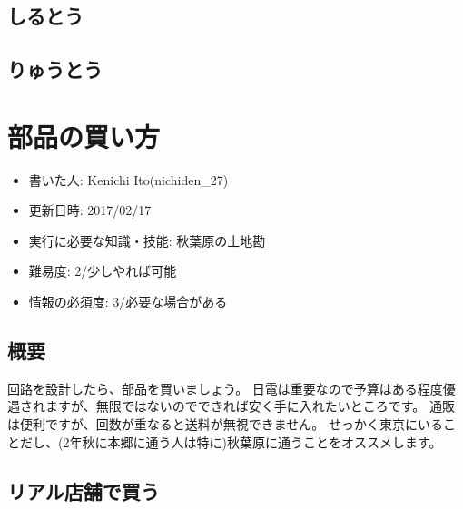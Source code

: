 \documentclass[letterpaper,10pt,dvipdfmx]{sphinxmanual}
\begin{document}
\section{しるとう}
\label{\detokenize{hojotou:id6}}

\section{りゅうとう}
\label{\detokenize{hojotou:id7}}

\chapter{部品の買い方}
\label{\detokenize{begginers/buy_parts::doc}}\label{\detokenize{begginers/buy_parts:id1}}\begin{itemize}
\item {} 
書いた人: Kenichi Ito(nichiden\_27)

\item {} 
更新日時: 2017/02/17

\item {} 
実行に必要な知識・技能: 秋葉原の土地勘

\item {} 
難易度: 2/少しやれば可能

\item {} 
情報の必須度: 3/必要な場合がある

\end{itemize}


\section{概要}
\label{\detokenize{begginers/buy_parts:id2}}
回路を設計したら、部品を買いましょう。
日電は重要なので予算はある程度優遇されますが、無限ではないのでできれば安く手に入れたいところです。
通販は便利ですが、回数が重なると送料が無視できません。
せっかく東京にいることだし、(2年秋に本郷に通う人は特に)秋葉原に通うことをオススメします。


\section{リアル店舗で買う}
\label{\detokenize{begginers/buy_parts:id3}}
\end{document}
